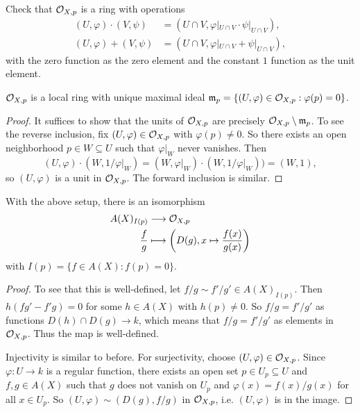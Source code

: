 \begin{exercise}
  Check that $\mathcal{O}_{X, p}$ is a ring
  with operations
  \begin{align*}
    (U, \varphi) \cdot (V, \psi)
    &= (U \cap V, \varphi|_{U \cap V} \cdot \psi|_{U \cap V}), \\
    (U, \varphi) + (V, \psi)
    &= (U \cap V, \varphi|_{U \cap V} + \psi|_{U \cap V}),
  \end{align*}
  with the zero function as the
  zero element and the constant $1$
  function as the unit element.
\end{exercise}

\begin{lemma}
  $\mathcal{O}_{X, p}$ is a local
  ring with unique maximal ideal
  $\mathfrak{m}_p = \{(U, \varphi) \in \mathcal{O}_{X, p} : \varphi(p) = 0\}$.
\end{lemma}

\begin{proof}
  It suffices to show that
  the units of $\mathcal{O}_{X, p}$ are precisely
  $\mathcal{O}_{X, p} \setminus \mathfrak{m}_p$. To
  see the reverse inclusion, fix
  $(U, \varphi) \in \mathcal{O}_{X, p}$ with
  $\varphi(p) \ne 0$. So there
  exists an open neighborhood
  $p \in W \subseteq U$ such that
  $\varphi|_W$ never vanishes. Then
  \[
    (U, \varphi) \cdot (W, 1 / \varphi|_W)
    = (W, \varphi|_W) \cdot (W, 1 / \varphi|_W))
    = (W, 1),
  \]
  so $(U, \varphi)$ is a unit
  in $\mathcal{O}_{X, p}$. The forward inclusion
  is similar.
\end{proof}

\begin{prop}
  With the above setup, there is an
  isomorphism
  \begin{align*}
    A(X)_{I(p)}
    &\longrightarrow \mathcal{O}_{X, p} \\
    \frac{f}{g}
    &\longmapsto
    \left(D(g), x \mapsto \frac{f(x)}{g(x)}\right)
  \end{align*}
  with $I(p) = \{f \in A(X) : f(p) = 0\}$.
\end{prop}

\begin{proof}
  To see that this is well-defined,
  let $f / g \sim f' / g' \in A(X)_{I(p)}$.
  Then $h (f g' - f' g) = 0$ for some
  $h \in A(X)$ with $h(p) \ne 0$. So
  $f / g = f' / g'$ as functions
  $D(h) \cap D(g) \to k$, which means
  that
  $f / g = f' / g'$ as elements in
  $\mathcal{O}_{X, p}$.
  Thus the map is well-defined.

  Injectivity is similar to before.
  For surjectivity, choose
  $(U, \varphi) \in \mathcal{O}_{X, p}$.
  Since $\varphi : U \to k$ is a
  regular function, there exists
  an open set $p \in U_p \subseteq U$
  and $f, g \in A(X)$ such that
  $g$ does not vanish on $U_p$
  and $\varphi(x) = f(x) / g(x)$
  for all $x \in U_p$. So
  $(U, \varphi) \sim (D(g), f / g)$ in
  $\mathcal{O}_{X, p}$, i.e. $(U, \varphi)$ is 
  in the image.
\end{proof}

